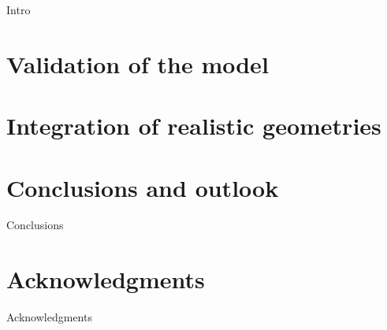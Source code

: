 \documentclass[a0,portrait]{a0poster}
\begin{document}
\vspace{-2cm} %


\begin{multicols}{2} %
\normalsize
\color{Navy} %
\color{Black}
Intro


\color{Navy} %
\section{Validation of the model}
\color{Black}


\color{Navy} %
\section{Integration of realistic geometries}
\color{Black}



\color{Navy} %
\section*{Conclusions and outlook}
\color{Black}
Conclusions
\color{Navy}
\section*{Acknowledgments}
\color{Black}
Acknowledgments
\begin{small}
\color{britishracinggreen}
\begin{thebibliography}{12} %


\end{thebibliography}
\end{small}
\end{multicols}
\end{document}
